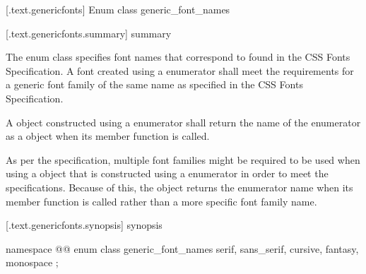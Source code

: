
 [\iotwod.text.genericfonts] {Enum class generic_font_names}

 [\iotwod.text.genericfonts.summary] { summary}

\pnum
The  enum class specifies font names that correspond to  found in the CSS Fonts Specification. A font created using a  enumerator shall meet the requirements for a generic font family of the same name as specified in the CSS Fonts Specification.

\pnum
A  object constructed using a  enumerator shall return the name of the enumerator as a  object when its  member function is called.

\pnum
\begin{note}
As per the specification, multiple font families might be required to be used when using a  object that is constructed using a  enumerator in order to meet the specifications. Because of this, the  object returns the enumerator name when its  member function is called rather than a more specific font family name.
\end{note}

 [\iotwod.text.genericfonts.synopsis] { synopsis}

%
\begin{codeblock}
namespace @\fullnamespace{}@ {
  enum class generic_font_names {
    serif,
    sans_serif,
    cursive,
    fantasy,
    monospace
  };
}
\end{codeblock}
